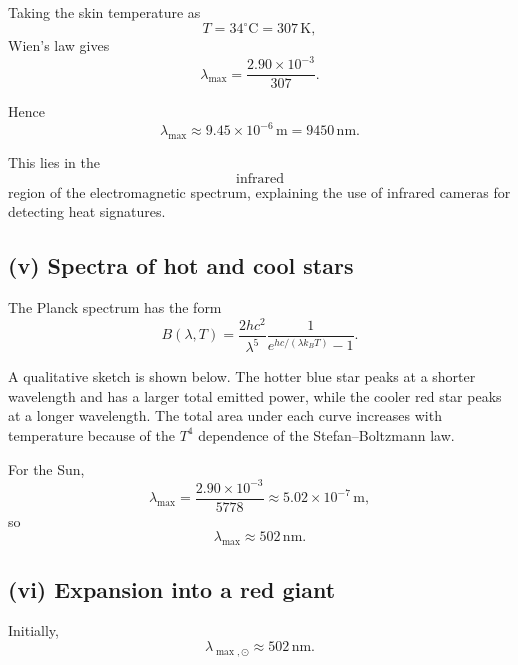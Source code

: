 \documentclass[11pt,a4paper]{article}
\begin{document}
Taking the skin temperature as
\[
T=34^\circ\mathrm C=307\,\mathrm K,
\]
Wien's law gives
\[
\lambda_{\max}
=
\frac{2.90\times10^{-3}}{307}.
\]

Hence
\[
\lambda_{\max}\approx9.45\times10^{-6}\,\mathrm m
=\boxed{9450\,\mathrm{nm}}.
\]

This lies in the
\[
\boxed{\text{infrared}}
\]
region of the electromagnetic spectrum, explaining the use of infrared cameras
for detecting heat signatures.

\subsection{(v) Spectra of hot and cool stars}

The Planck spectrum has the form
\[
B(\lambda,T)
=
\frac{2hc^2}{\lambda^5}
\frac{1}{e^{hc/(\lambda k_BT)}-1}.
\]

A qualitative sketch is shown below. The hotter blue star peaks at a shorter
wavelength and has a larger total emitted power, while the cooler red star peaks at a
longer wavelength. The total area under each curve increases with temperature because
of the $T^4$ dependence of the Stefan--Boltzmann law.

\begin{center}
\end{center}

For the Sun,
\[
\lambda_{\max}
=
\frac{2.90\times10^{-3}}{5778}
\approx5.02\times10^{-7}\,\mathrm m,
\]
so
\[
\boxed{\lambda_{\max}\approx502\,\mathrm{nm}}.
\]

\subsection{(vi) Expansion into a red giant}

Initially,
\[
\lambda_{\max,\odot}\approx502\,\mathrm{nm}.
\]
\end{document}
